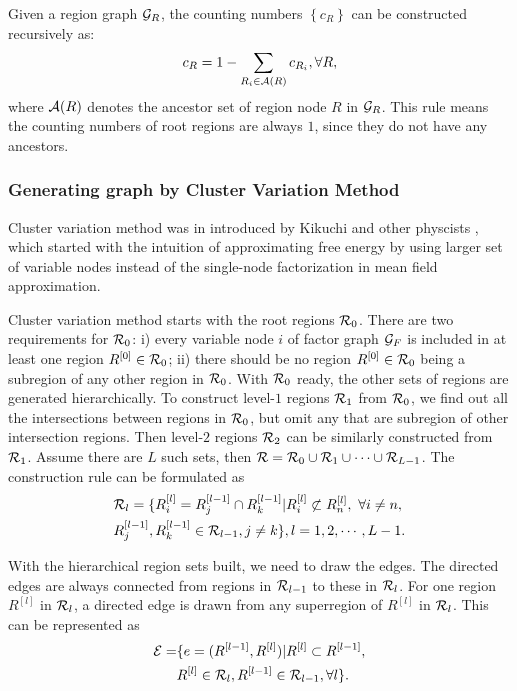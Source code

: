 Given a region graph $\mathcal{G}_R$, the counting numbers $\left\{ c_R \right\}$ can be constructed recursively as:
\begin{equation}
  c_R = 1 - \sum_{R_i \in \mathcal{A}(R)} c_{R_i}, \forall R,
\end{equation}
where $\mathcal{A}(R)$ denotes the ancestor set of region node $R$ in $\mathcal{G}_R$. This rule means the counting numbers of root regions are always $1$, since they do not have any ancestors.


\subsubsection{Generating graph by Cluster Variation Method}
\label{sec:cluster-variation-method}
Cluster variation method was in introduced by Kikuchi and other physcists \cite{PhysRev.81.988,morita1991cluster}, which started with the intuition of approximating free energy by using larger set of variable nodes instead of the single-node factorization in mean field approximation.

Cluster variation method starts with the root regions $\mathcal{R}_0$. There are two requirements for $\mathcal{R}_0$: i) every variable node $i$ of factor graph $\mathcal{G}_F$ is included in at least one region $R^{[0]}\in\mathcal{R}_0$; ii) there should be no region $R^{[0]}\in \mathcal{R}_0$ being a subregion of any other region in $\mathcal{R}_0$.
With $\mathcal{R}_0$ ready, the other sets of regions are generated hierarchically. To construct level-$1$ regions $\mathcal{R}_1$ from $\mathcal{R}_0$, we find out all the intersections between regions in $\mathcal{R}_0$, but omit any that are subregion of other intersection regions. Then level-$2$ regions $\mathcal{R}_2$ can be similarly constructed from $\mathcal{R}_1$. Assume there are $L$ such sets, then $\mathcal{R} = \mathcal{R}_0 \cup \mathcal{R}_1 \cup \cdots \cup \mathcal{R}_{L-1}$. The construction rule can be formulated as
\begin{align}
  &\mathcal{R}_l = \{ R^{[l]}_i = R^{[l-1]}_j \cap R^{[l-1]}_k | R^{[l]}_i \not\subset R^{[l]}_n,~ \forall i \neq n, \nonumber \\
  &R^{[l-1]}_j, R^{[l-1]}_k \in \mathcal{R}_{l-1} , j\neq k\}, l=1, 2, \cdots, L-1.
\end{align}

With the hierarchical region sets built, we need to draw the edges. The directed edges are always connected from regions in $\mathcal{R}_{l-1}$ to these in $\mathcal{R}_{l}$. For one region $R^{[l]}$ in $\mathcal{R}_l$, a directed edge is drawn from any superregion of $R^{[l]}$ in $\mathcal{R}_l$. This can be represented as
\begin{align}
  \mathcal{E} = &\{ e = (R^{[l-1]}, R^{[l]}) | R^{[l]} \subset R^{[l-1]}, \nonumber \\
        &R^{[l]} \in \mathcal{R}_l, R^{[l-1]} \in \mathcal{R}_{l-1} , \forall l\}.
\end{align}



